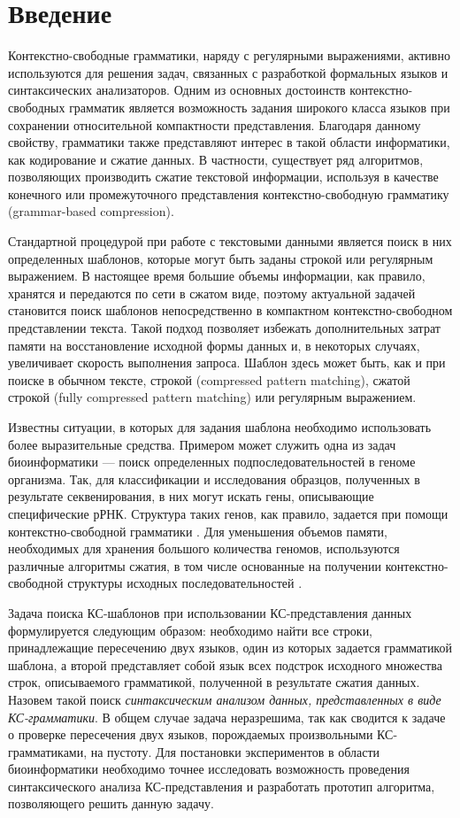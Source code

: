 \section*{Введение}

Контекстно-свободные грамматики, наряду с регулярными выражениями, активно используются для решения задач, связанных с разработкой формальных языков и синтаксических анализаторов. 
Одним из основных достоинств контекстно-свободных грамматик является возможность задания широкого класса языков при сохранении относительной компактности представления. 
Благодаря данному свойству, грамматики также представляют интерес в такой области информатики, как кодирование и сжатие данных. 
В частности, существует ряд алгоритмов, позволяющих производить сжатие текстовой информации, используя в качестве конечного \cite{Sequitur} или промежуточного \cite{Arimura} представления контекстно-свободную грамматику (grammar-based compression). 

Стандартной процедурой при работе с текстовыми данными является поиск в них определенных шаблонов, которые могут быть заданы строкой или регулярным выражением. 
В настоящее время большие объемы информации, как правило, хранятся и передаются по сети в сжатом виде, поэтому актуальной задачей становится поиск шаблонов непосредственно в компактном контекстно-свободном представлении текста.
Такой подход позволяет избежать дополнительных затрат памяти на восстановление исходной формы данных и, в некоторых случаях, увеличивает скорость выполнения запроса.
Шаблон здесь может быть, как и при поиске в обычном тексте, строкой (compressed pattern matching), сжатой строкой (fully compressed pattern matching) или регулярным выражением.

Известны ситуации, в которых для задания шаблона необходимо использовать более выразительные средства. 
Примером может служить одна из задач биоинформатики --- поиск определенных подпоследовательностей в геноме организма. Так, для классификации и исследования образцов, полученных в результате секвенирования, в них могут искать гены, описывающие специфические рРНК. Структура таких генов, как правило, задается при помощи контекстно-свободной грамматики \cite{Anderson2013}. Для уменьшения объемов памяти, необходимых для хранения большого количества геномов, используются различные алгоритмы сжатия, в том числе основанные на получении контекстно-свободной структуры исходных последовательностей \cite{galle2011dna}.

Задача поиска КС-шаблонов при использовании КС-представления данных формулируется следующим образом: необходимо найти все строки, принадлежащие пересечению двух языков, один из которых задается грамматикой шаблона, а второй представляет собой язык всех подстрок исходного множества строк, описываемого грамматикой, полученной в результате сжатия данных.
Назовем такой поиск \textit{синтаксическим анализом данных, представленных в виде КС-грамматики}.
В общем случае задача неразрешима, так как сводится к задаче о проверке пересечения двух языков, порождаемых произвольными КС-грамматиками, на пустоту. 
Для постановки экспериментов в области биоинформатики необходимо точнее исследовать возможность проведения синтаксического анализа КС-представления и разработать прототип алгоритма, позволяющего решить данную задачу.